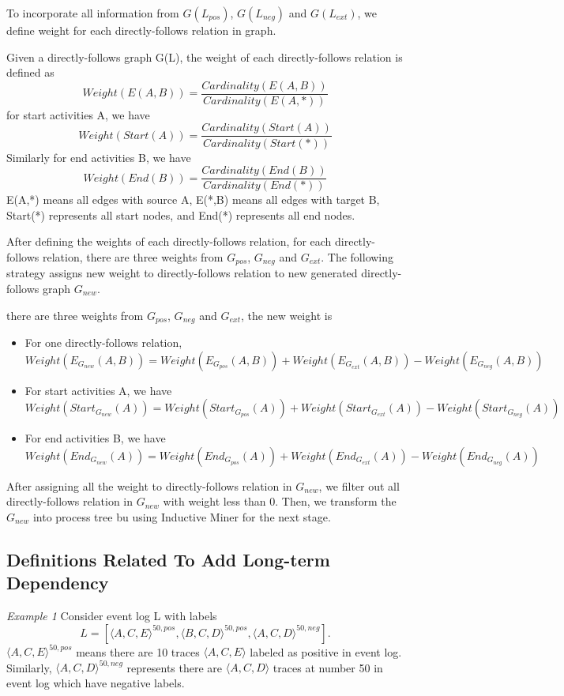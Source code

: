 To incorporate all information from  $G(L_{pos})$, $G(L_{neg})$ and $G(L_{ext})$, we define  weight for each directly-follows relation in graph. 
\begin{definition}
	Given a directly-follows graph G(L), the weight of each directly-follows relation is defined as \[ Weight(E(A,B)) = \frac{Cardinality(E(A,B))}{Cardinality(E(A,*))}  \] 
	for start activities A, we have 
	\[ Weight(Start(A)) = \frac{Cardinality(Start(A))}{Cardinality(Start(*))} \]
	Similarly for end activities B, we have
	\[ Weight(End(B)) = \frac{Cardinality(End(B))}{Cardinality(End(*))} \]
	E(A,*) means all edges with source A, E(*,B) means all edges with target B, Start(*) represents all start nodes, and End(*) represents all end nodes.
\end{definition}
After defining the weights of each directly-follows relation, for each directly-follows relation, there are three weights from $G_{pos}$, $G_{neg}$ and $G_{ext}$. The following strategy assigns new weight to directly-follows relation to new generated directly-follows graph $G_{new}$.
\begin{definition}
	there are three weights from $G_{pos}$, $G_{neg}$ and $G_{ext}$, the new weight is 
	\begin{itemize}
		\item For one directly-follows relation, \[ Weight(E_{G_{new}}(A,B)) = Weight(E_{G_{pos}}(A,B)) + Weight(E_{G_{ext}}(A,B)) - Weight(E_{G_{neg}}(A,B))\]
		\item For start activities A, we have 
		\[ Weight(Start_{G_{new}}(A)) = Weight(Start_{G_{pos}}(A)) + Weight(Start_{G_{ext}}(A)) - Weight(Start_{G_{neg}}(A)) \]
		\item For end activities B, we have
		\[ Weight(End_{G_{new}}(A)) = Weight(End_{G_{pos}}(A)) + Weight(End_{G_{ext}}(A)) - Weight(End_{G_{neg}}(A)) \]
	\end{itemize}
\end{definition}
After assigning all the weight to directly-follows relation in $G_{new}$, we filter out all directly-follows relation in $G_{new}$ with weight less than 0. 
Then, we transform the $G_{new}$ into process tree bu using Inductive Miner for the next stage.

\subsection{Definitions Related To Add Long-term Dependency}
\textit{Example 1} Consider event log L with labels \[L =[\langle A,C,E \rangle^{50,pos}, \langle B,C,D \rangle^{50,pos}, \langle A,C,D \rangle^{50,neg}]. \] $\langle A,C,E \rangle^{50,pos}$ means there are 10 traces $\langle A,C,E \rangle$ labeled as positive in event log. Similarly, $\langle A,C,D \rangle^{50,neg}$ represents there are $\langle A,C,D \rangle$ traces at number 50 in event log which have negative labels. 

